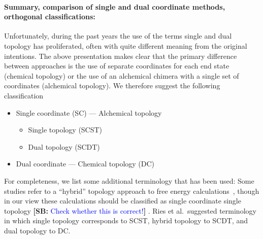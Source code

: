 \documentclass[9pt,bestpractices]{livecoms}
\newcommand{\sbnote}[1]{%
  {\bfseries{}[SB: }%
  {\textcolor{blue}{#1}}{\bfseries{}]}
  }
\begin{document}
\paragraph{Summary, comparison of single and dual coordinate methods, orthogonal classifications:}


Unfortunately, during the past years the use of the terms single and dual topology has proliferated, often with quite different meaning from the original intentions. The above presentation makes clear that the primary difference between approaches is the use of separate coordinates for each end state (chemical topology) or the use of an alchemical chimera with a single set of coordinates (alchemical topology). We therefore suggest the following classification
\begin{itemize}
\item Single coordinate (SC) --- Alchemical topology
  \begin{itemize}
  \item Single topology (SCST)
    \item Dual topology (SCDT)
  \end{itemize}
  \item Dual coordinate --- Chemical topology (DC)
  \end{itemize}
For completeness, we list some additional terminology that has been used: Some studies refer to a ``hybrid'' topology approach to free energy calculations~\cite{gapsys2015pmx, gapsys2016accurate, gapsys2020large}, though in our view these calculations should be classified as single coordinate single topology \sbnote{Check whether this is correct!}. %
Ries et al.\ suggested terminology \cite{Ries_2022} in which single topology corresponds to SCST, hybrid topology to SCDT, and dual topology to DC.
\end{document}
